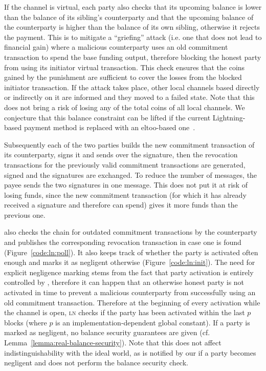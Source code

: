   If the channel is virtual, each party also checks that its upcoming balance is
  lower than the balance of its sibling's counterparty and that the upcoming
  balance of the counterparty is higher than the balance of its own sibling,
  otherwise it rejects the payment. This is to mitigate a ``griefing'' attack (i.e.
  one that does not lead to financial gain) where a malicious counterparty
  uses an old commitment transaction to spend the base funding output, therefore
  blocking the honest party from using its initiator virtual transaction. This
  check ensures that the coins gained by the punishment are sufficient to cover
  the losses from the blocked initiator transaction. If the attack takes place,
  other local channels based directly or indirectly on it are informed and they
  moved to a failed state. Note that this does not bring a risk of losing any of
  the total coins of all local channels. We conjecture that this balance
  constraint can be lifted if the current Lightning-based payment method is
  replaced with an eltoo-based one~\cite{eltoo}.

  Subsequently each of the two parties builds the new commitment transaction of
  its counterparty, signs it and sends over the signature, then the revocation
  transactions for the previously valid commitment transactions are generated,
  signed and the signatures are exchanged. To reduce the number of messages, the
  payee sends the two signatures in one message. This does not put it at risk of
  losing funds, since the new commitment transaction (for which it has already
  received a signature and therefore can spend) gives it more funds than the
  previous one.

  \pchan also checks the chain for outdated commitment transactions by the
  counterparty and publishes the corresponding revocation transaction in case
  one is found (Figure~\ref{code:ln:poll}). It also keeps track of whether the
  party is activated often enough and marks it as negligent otherwise
  (Figure~\ref{code:ln:init}). The need for explicit negligence marking stems
  from the fact that party activation is entirely controlled by \environment,
  therefore it can happen that an otherwise honest party is not activated in
  time to prevent a malicious counterparty from successfully using an old
  commitment transaction. Therefore at the beginning of every activation while
  the channel is open, \textsc{ln} checks if the party has been activated within
  the last $p$ blocks (where $p$ is an implementation-dependent global
  constant). If a party is marked as negligent, no balance security guarantees
  are given (cf. Lemma~\ref{lemma:real-balance-security}). Note that this does
  not affect indistinguishability with the ideal world, as \fchan is notified by
  our \simulator if a party becomes negligent and does not perform the balance
  security check.

